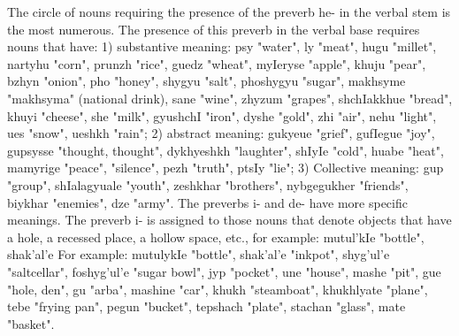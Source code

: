 \documentclass[a4paper,12pt]{book}
\newcommand{\1}[1]{\textbf{\emph{#1}}} %
\newcommand{\2}[1]{\textbf{[#1]}} %
\newcommand{\3}[1]{\fontsize{11pt}{0cm}\textbf{\emph{#1}}} %
\newcommand{\4}[1]{\fontsize{10pt}{0cm}\emph{#1}}	%
\newcommand{\5}[1]{\textbf{/#1/}} %
\newcommand{\6}[1]{\textbf{[#1]}} %
\newcommand{\7}[1]{\fontsize{12pt}{0cm}\emph{#1}} %
\newcommand{\8}[1]{\fontsize{12pt}{0cm}`#1'} %
\newcommand{\9}[1]{\fontsize{12pt}{0cm}(lit. `#1')} %
\begin{document}
The circle of nouns requiring the presence of the preverb he- in the verbal stem is the most numerous. The presence of this preverb in the verbal base requires nouns that have:
1) substantive meaning: psy "water", ly "meat", hugu "millet", nartyhu "corn", prunzh "rice", guedz "wheat", myIeryse "apple", khuju "pear", bzhyn "onion", pho "honey", shygyu "salt", phoshygyu "sugar", makhsyme "makhsyma" (national drink), sane "wine", zhyzum "grapes", shchIakkhue "bread", khuyi "cheese", she "milk", gyushchI "iron", dyshe "gold", zhi "air", nehu "light", ues "snow", ueshkh "rain";
2) abstract meaning: gukyeue "grief", gufIegue "joy", gupsysse "thought, thought", dykhyeshkh "laughter", shIyIe "cold", huabe "heat", mamyrige "peace", "silence", pezh "truth", ptsIy "lie";
3) Collective meaning: gup "group", shIalagyuale "youth", zeshkhar "brothers", nybgegukher "friends", biykhar "enemies", dze "army".
The preverbs i- and de- have more specific meanings. The preverb i- is assigned to those nouns that denote objects that have a hole, a recessed place, a hollow space, etc., for example: mutul'kIe "bottle", shak'al'e For example: mutulykIe "bottle", shak'al'e "inkpot", shyg'ul'e "saltcellar", foshyg'ul'e "sugar bowl", jyp "pocket", une "house", mashe "pit", gue "hole, den", gu "arba", mashine "car", khukh "steamboat", khukhlyate "plane", tebe "frying pan", pegun "bucket", tepshach "plate", stachan "glass", mate "basket".
\end{document}
